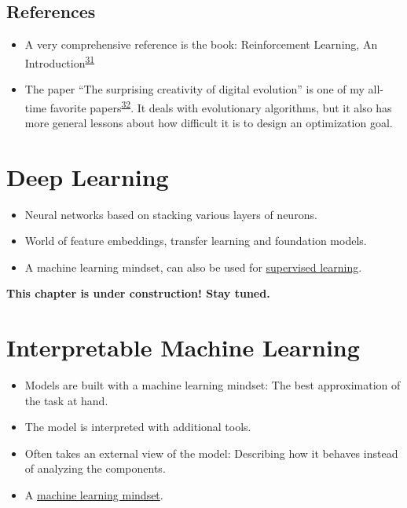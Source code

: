 \documentclass[
  10pt,
]{scrbook}
\providecommand{\tightlist}{%
  \setlength{\itemsep}{0pt}\setlength{\parskip}{0pt}}
\begin{document}
\hypertarget{references-1}{%
\section{References}\label{references-1}}

\begin{itemize}
\tightlist
\item
  A very comprehensive reference is the book: Reinforcement Learning, An Introduction\textsuperscript{\protect\hyperlink{ref-sutton2018reinforcement}{31}}
\item
  The paper ``The surprising creativity of digital evolution'' is one of my all-time favorite papers\textsuperscript{\protect\hyperlink{ref-lehman2020surprising}{32}}. It deals with evolutionary algorithms, but it also has more general lessons about how difficult it is to design an optimization goal.
\end{itemize}

\hypertarget{deep-learning}{%
\chapter{Deep Learning}\label{deep-learning}}

\begin{itemize}
\tightlist
\item
  Neural networks based on stacking various layers of neurons.
\item
  World of feature embeddings, transfer learning and foundation models.
\item
  A machine learning mindset, can also be used for \protect\hyperlink{supervised-ml}{supervised learning}.
\end{itemize}

\textbf{This chapter is under construction! Stay tuned.}

\hypertarget{interpretable-ml}{%
\chapter{Interpretable Machine Learning}\label{interpretable-ml}}

\begin{itemize}
\tightlist
\item
  Models are built with a machine learning mindset: The best approximation of the task at hand.
\item
  The model is interpreted with additional tools.
\item
  Often takes an external view of the model: Describing how it behaves instead of analyzing the components.
\item
  A \protect\hyperlink{machine-learning}{machine learning mindset}.
\end{itemize}
\end{document}
